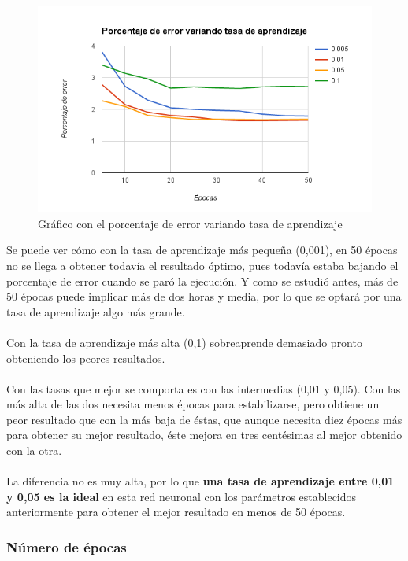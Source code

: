 \begin{figure}[H]
\centering
\includegraphics[width=14cm]{img/learning-rate}
\caption{Gráfico con el porcentaje de error variando tasa de aprendizaje}
\label{fig:learning-rate}
\end{figure}

Se puede ver cómo con la tasa de aprendizaje más pequeña (0,001), en 50 épocas no se llega a obtener todavía el resultado óptimo, pues todavía estaba bajando el porcentaje de error cuando se paró la ejecución. Y como se estudió antes, más de 50 épocas puede implicar más de dos horas y media, por lo que se optará por una tasa de aprendizaje algo más grande.
\\ \\
Con la tasa de aprendizaje más alta (0,1) sobreaprende demasiado pronto obteniendo los peores resultados.
\\ \\
Con las tasas que mejor se comporta es con las intermedias (0,01 y 0,05). Con las más alta de las dos necesita menos épocas para estabilizarse, pero obtiene un peor resultado que con la más baja de éstas, que aunque necesita diez épocas más para obtener su mejor resultado, éste mejora en tres centésimas al mejor obtenido con la otra.
\\ \\
La diferencia no es muy alta, por lo que \textbf{una tasa de aprendizaje entre 0,01 y 0,05 es la ideal} en esta red neuronal con los parámetros establecidos anteriormente para obtener el mejor resultado en menos de 50 épocas.

\subsubsection{Número de épocas}

